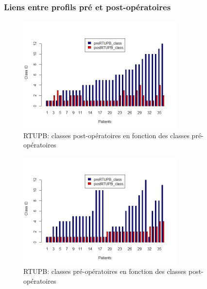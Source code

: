 %

\subsubsection{Liens entre profils pré et post-opératoires}

\begin{figure}[H]
\centering
\includegraphics[width=0.75\textwidth]{../Fig/RTUPB/rtupb-histogram-pre-post.png}
\caption{RTUPB: classes post-opératoires en fonction des classes pré-opératoires}
\label{fig-rtupb-histogram}
\end{figure}

\begin{figure}[H]
\centering
\includegraphics[width=0.75\textwidth]{../Fig/RTUPB/rtupb-histogram-post-pre.png}
\caption{RTUPB: classes pré-opératoires en fonction des classes post-opératoires}
\label{fig-rtupb-histogram}
\end{figure}

